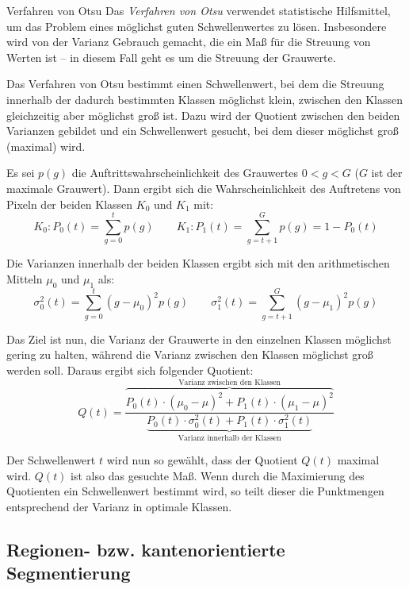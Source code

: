 \begin{defi}{Verfahren von Otsu}
    Das \emph{Verfahren von Otsu} verwendet statistische Hilfsmittel, um das Problem eines möglichst guten Schwellenwertes zu lösen. Insbesondere wird von der Varianz Gebrauch gemacht, die ein Maß für die Streuung von Werten ist -- in diesem Fall geht es um die Streuung der Grauwerte.

    Das Verfahren von Otsu bestimmt einen Schwellenwert, bei dem die Streuung innerhalb der dadurch bestimmten Klassen möglichst klein, zwischen den Klassen gleichzeitig aber möglichst groß ist.
    Dazu wird der Quotient zwischen den beiden Varianzen gebildet und ein Schwellenwert gesucht, bei dem dieser möglichst groß (maximal) wird.

    Es sei $p(g)$ die Auftrittswahrscheinlichkeit des Grauwertes $0 < g < G$ ($G$ ist der maximale Grauwert).
    Dann ergibt sich die Wahrscheinlichkeit des Auftretens von Pixeln der beiden Klassen $K_0$ und $K_1$ mit:
    \[
        K_0: P_{0}(t) = \sum_{g = 0}^{t} p(g) \qquad K_1: P_{1}(t) = \sum_{g = t+1}^{G} p(g) = 1 - P_{0}(t)
    \]

    Die Varianzen innerhalb der beiden Klassen ergibt sich mit den arithmetischen Mitteln $\mu_0$ und $\mu_1$ als:
    \[
        \sigma _{0}^{2}(t) = \sum_{g=0}^{t} (g - \mu_0)^{2} p(g) \qquad \sigma_{1}^{2}(t) = \sum_{g=t+1}^{G} (g - \mu_1)^{2} p(g)
    \]

    Das Ziel ist nun, die Varianz der Grauwerte in den einzelnen Klassen möglichst gering zu halten, während die Varianz zwischen den Klassen möglichst groß werden soll. Daraus ergibt sich folgender Quotient:
    \[
        Q(t) = \frac{\overbrace{P_0(t) \cdot (\mu_0 - \mu)^2 + P_1(t) \cdot (\mu_1 - \mu)^2}^{\text{Varianz zwischen den Klassen}}}{\underbrace{P_0(t) \cdot \sigma _{0}^{2}(t) + P_1(t) \cdot \sigma _{1}^{2}(t)}_{\text{Varianz innerhalb der Klassen}}}
    \]

    Der Schwellenwert $t$ wird nun so gewählt, dass der Quotient $Q(t)$ maximal wird.
    $Q(t)$ ist also das gesuchte Maß.
    Wenn durch die Maximierung des Quotienten ein Schwellenwert bestimmt wird, so teilt dieser die Punktmengen entsprechend der Varianz in optimale Klassen.
\end{defi}

\subsection{Regionen- bzw. kantenorientierte Segmentierung}

